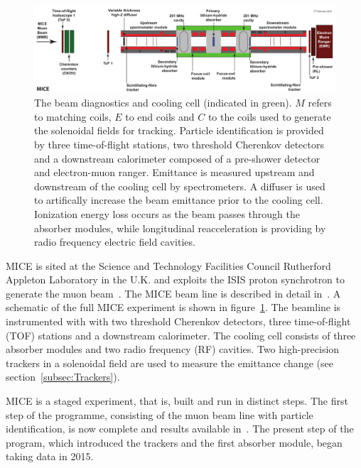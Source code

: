   \begin{figure}[bht]
    \begin{center}
      \includegraphics[width=1.0\linewidth]{01-MICE/Cooling-demo-labels.pdf}
      \caption{\label{fig:CoolingChannel} The beam diagnostics and cooling cell (indicated in green). $M$ refers to matching coils, $E$ to end coils and $C$ to the coils used to generate the solenoidal fields for tracking. Particle identification is provided by three time-of-flight stations, two threshold Cherenkov detectors and a downstream calorimeter composed of a pre-shower detector and electron-muon ranger. Emittance is measured upstream and downstream of the cooling cell by spectrometers. A diffuser is used to artifically increase the beam emittance prior to the cooling cell. Ionization energy loss occurs as the beam passes through the absorber modules, while longitudinal reacceleration is providing by radio frequency electric field cavities.}
    \end{center}
  \end{figure}

  MICE is sited at the Science and Technology Facilities Council Rutherford Appleton Laboratory in the U.K. and exploits the ISIS proton synchrotron to generate the muon beam~\cite{MiceTarget}.  The MICE beam line is described in detail in~\cite{MiceBeamline}. A schematic of the full MICE experiment is shown in figure~\ref{fig:CoolingChannel}. The beamline is instrumented with with two threshold Cherenkov detectors, three time-of-flight (TOF) stations and a downstream calorimeter. The cooling cell consists of three absorber modules and two radio frequency (RF) cavities. Two high-precision trackers in a solenoidal field are used to measure the emittance change (see section~\ref{subsec:Trackers}).

  MICE is a staged experiment, that is, built and run in distinct steps. The first step of the programme, consisting of the muon beam line with particle identification, is now complete and results available in~\cite{MiceBeamline}. The present step of the program, which introduced the trackers and the first absorber module, began taking data in 2015. %

